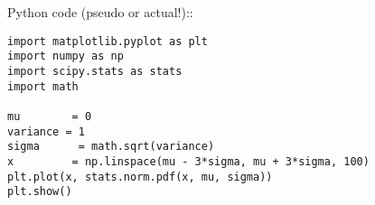 \documentclass[11pt,a4paper]{article}
\begin{document}
\vspace{34pt}
\noindent
Python code (pseudo or actual!)::  
\begin{lstlisting}
import matplotlib.pyplot as plt
import numpy as np
import scipy.stats as stats
import math

mu        = 0
variance = 1
sigma      = math.sqrt(variance)
x         = np.linspace(mu - 3*sigma, mu + 3*sigma, 100)
plt.plot(x, stats.norm.pdf(x, mu, sigma))
plt.show()
  \end{lstlisting}  
\end{document}
